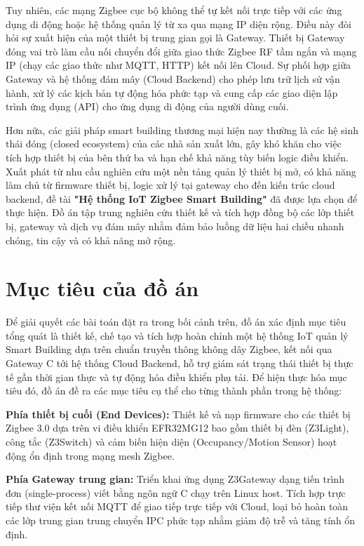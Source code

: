 Tuy nhiên, các mạng Zigbee cục bộ không thể tự kết nối trực tiếp với các ứng dụng di động hoặc hệ thống quản lý từ xa qua mạng IP diện rộng. Điều này đòi hỏi sự xuất hiện của một thiết bị trung gian gọi là Gateway. Thiết bị Gateway đóng vai trò làm cầu nối chuyển đổi giữa giao thức Zigbee RF tầm ngắn và mạng IP (chạy các giao thức như MQTT, HTTP) kết nối lên Cloud. Sự phối hợp giữa Gateway và hệ thống đám mây (Cloud Backend) cho phép lưu trữ lịch sử vận hành, xử lý các kịch bản tự động hóa phức tạp và cung cấp các giao diện lập trình ứng dụng (API) cho ứng dụng di động của người dùng cuối. 

Hơn nữa, các giải pháp smart building thương mại hiện nay thường là các hệ sinh thái đóng (closed ecosystem) của các nhà sản xuất lớn, gây khó khăn cho việc tích hợp thiết bị của bên thứ ba và hạn chế khả năng tùy biến logic điều khiển. Xuất phát từ nhu cầu nghiên cứu một nền tảng quản lý thiết bị mở, có khả năng làm chủ từ firmware thiết bị, logic xử lý tại gateway cho đến kiến trúc cloud backend, đề tài \textbf{"Hệ thống IoT Zigbee Smart Building"} đã được lựa chọn để thực hiện. Đồ án tập trung nghiên cứu thiết kế và tích hợp đồng bộ các lớp thiết bị, gateway và dịch vụ đám mây nhằm đảm bảo luồng dữ liệu hai chiều nhanh chóng, tin cậy và có khả năng mở rộng.

\section{Mục tiêu của đồ án}
\label{sec:ch1-muctieu}

Để giải quyết các bài toán đặt ra trong bối cảnh trên, đồ án xác định mục tiêu tổng quát là thiết kế, chế tạo và tích hợp hoàn chỉnh một hệ thống IoT quản lý Smart Building dựa trên chuẩn truyền thông không dây Zigbee, kết nối qua Gateway C tới hệ thống Cloud Backend, hỗ trợ giám sát trạng thái thiết bị thực tế gần thời gian thực và tự động hóa điều khiển phụ tải. Để hiện thực hóa mục tiêu đó, đồ án đề ra các mục tiêu cụ thể cho từng thành phần trong hệ thống:

\textbf{Phía thiết bị cuối (End Devices):} Thiết kế và nạp firmware cho các thiết bị Zigbee 3.0 dựa trên vi điều khiển EFR32MG12 bao gồm thiết bị đèn (Z3Light), công tắc (Z3Switch) và cảm biến hiện diện (Occupancy/Motion Sensor) hoạt động ổn định trong mạng mesh Zigbee.

\textbf{Phía Gateway trung gian:} Triển khai ứng dụng Z3Gateway dạng tiến trình đơn (single-process) viết bằng ngôn ngữ C chạy trên Linux host. Tích hợp trực tiếp thư viện kết nối MQTT để giao tiếp trực tiếp với Cloud, loại bỏ hoàn toàn các lớp trung gian trung chuyển IPC phức tạp nhằm giảm độ trễ và tăng tính ổn định.

